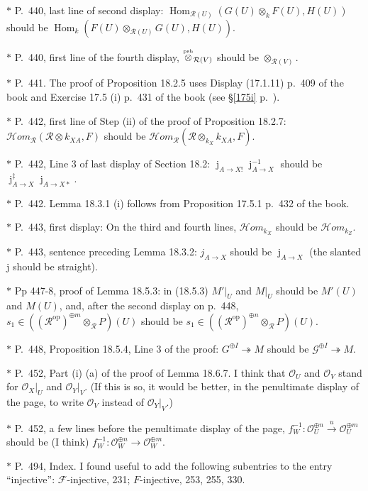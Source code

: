 \documentclass[12pt]{article}
\theoremstyle{remark}
\theoremstyle{definition}
\newcommand{\nn}{\noindent}
\newcommand{\cc}{\mathcal}
\newcommand{\oo}{\operatorname}
\newcommand{\epi}{\twoheadrightarrow}
\newcommand{\HOM}{\cc H\!\mathit{om}}
\newcommand{\xr}{\xrightarrow}
\DeclareMathOperator{\jj}{j}
\DeclareMathOperator{\Hom}{Hom}
\DeclareMathOperator{\op}{op}
\begin{document}
\nn$*$ P.~440, last line of second display: $\Hom_{\cc R(U)}(G(U)\otimes_kF(U),H(U))$ should be $\Hom_k(F(U)\otimes_{\cc R(U)}G(U),H(U))$. 

\nn$*$ P.~440, first line of the fourth display, $\overset{\text{\tiny psh}}{\otimes}_{\cc R(V)}$ should be $\otimes_{\cc R(V)}$. 

\nn$*$ P.~441. The proof of Proposition 18.2.5 uses Display (17.1.11) p.~409 of the book and Exercise 17.5 (i) p.~431 of the book (see \S\ref{175i} p.~\pageref{175i}).  

\nn$*$ P.~442, first line of Step (ii) of the proof of Proposition 18.2.7: $\HOM_{\cc R}(\cc R\otimes k_{XA},F)$ should be $\HOM_{\cc R}(\cc R\otimes_{k_X}k_{XA},F)$. 

\nn$*$ P.~442, Line 3 of last display of Section 18.2: $\jj_{A\to X!}\jj_{A\to X}^{-1}$ should be $\jj_{A\to X}^\ddagger\jj_{A\to X*}$. 

\nn$*$ P.~442. Lemma 18.3.1 (i) follows from Proposition 17.5.1 p.~432 of the book. 

\nn$*$ P.~443, first display: On the third and fourth lines, $\HOM_{k_X}$ should be $\HOM_{k_Z}$. 

\nn$*$ P.~443, sentence preceding Lemma 18.3.2: $j_{A\to X}$ should be $\oo j_{A\to X}$ (the slanted j should be straight). 

\nn$*$ Pp 447-8, proof of Lemma 18.5.3: in (18.5.3) $M'|_U$ and $M|_U$ should be $M'(U)$ and $M(U)$, and, after the second display on p.~448, $s_1\in((\cc R^{\op})^{\oplus m}\otimes_{\cc R}P)(U)$ should be $s_1\in((\cc R^{\op})^{\oplus n}\otimes_{\cc R}P)(U)$.

\nn$*$ P.~448, Proposition 18.5.4, Line 3 of the proof: $G^{\oplus I}\epi M$ should be $\cc G^{\oplus I}\epi M$.

\nn$*$ P.~452, Part (i) (a) of the proof of Lemma 18.6.7. I think that $\cc O_U$ and $\cc O_V$ stand for $\cc O_X|_U$ and $\cc O_Y|_V$. (If this is so, it would be better, in the penultimate display of the page, to write $\cc O_V$ instead of $\cc O_Y|_V$.) 

\nn$*$ P.~452, a few lines before the penultimate display of the page, $f_W^{-1}:\cc O_U^{\oplus n}\xr u\cc O_U^{\oplus m}$ should be (I think) $f_W^{-1}:\cc O_W^{\oplus n}\to\cc O_W^{\oplus m}$.

\nn$*$ P.~494, Index. I found useful to add the following subentries to the entry ``injective'': $\cc F$-injective, 231; $F$-injective, 253, 255, 330.

\end{document}
